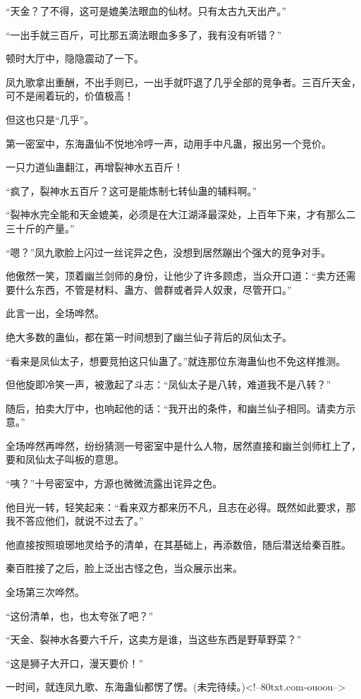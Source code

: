 \begin{this_body}
“天金？了不得，这可是媲美法眼血的仙材。只有太古九天出产。”

“一出手就三百斤，可比那五滴法眼血多多了，我有没有听错？”

顿时大厅中，隐隐震动了一下。

凤九歌拿出重酬，不出手则已，一出手就吓退了几乎全部的竞争者。三百斤天金，可不是闹着玩的，价值极高！

但这也只是“几乎”。

第一密室中，东海蛊仙不悦地冷哼一声，动用手中凡蛊，报出另一个竞价。

一只力道仙蛊翻江，再增裂神水五百斤！

“疯了，裂神水五百斤？这可是能炼制七转仙蛊的辅料啊。”

“裂神水完全能和天金媲美，必须是在大江湖泽最深处，上百年下来，才有那么二三十斤的产量。”

“嗯？”凤九歌脸上闪过一丝诧异之色，没想到居然蹦出个强大的竞争对手。

他傲然一笑，顶着幽兰剑师的身份，让他少了许多顾虑，当众开口道：“卖方还需要什么东西，不管是材料、蛊方、兽群或者异人奴隶，尽管开口。”

此言一出，全场哗然。

绝大多数的蛊仙，都在第一时间想到了幽兰仙子背后的凤仙太子。

“看来是凤仙太子，想要竞拍这只仙蛊了。”就连那位东海蛊仙也不免这样推测。

但他旋即冷笑一声，被激起了斗志：“凤仙太子是八转，难道我不是八转？”

随后，拍卖大厅中，也响起他的话：“我开出的条件，和幽兰仙子相同。请卖方示意。”

全场哗然再哗然，纷纷猜测一号密室中是什么人物，居然直接和幽兰剑师杠上了，要和凤仙太子叫板的意思。

“咦？”十号密室中，方源也微微流露出诧异之色。

他目光一转，轻笑起来：“看来双方都来历不凡，且志在必得。既然如此要求，那我不答应他们，就说不过去了。”

他直接按照琅琊地灵给予的清单，在其基础上，再添数倍，随后潜送给秦百胜。

秦百胜接了之后，脸上泛出古怪之色，当众展示出来。

全场第三次哗然。

“这份清单，也，也太夸张了吧？”

“天金、裂神水各要六千斤，这卖方是谁，当这些东西是野草野菜？”

“这是狮子大开口，漫天要价！”

一时间，就连凤九歌、东海蛊仙都愣了愣。(未完待续。)<!--80txt.com-ouoou-->

\end{this_body}

